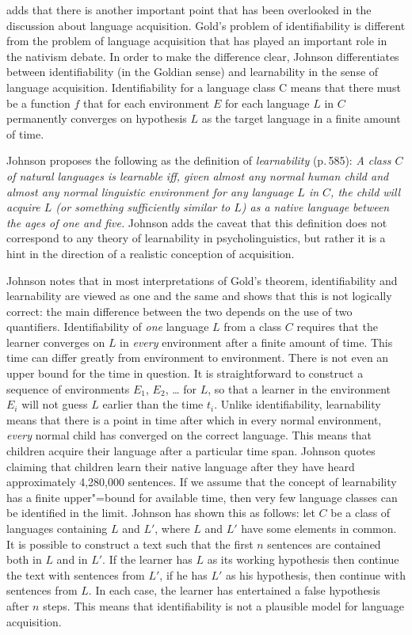 \citet{Johnson2004a} adds that there is another important point that has been overlooked in the discussion about language acquisition. Gold's problem
of identifiability is different from the problem of language acquisition that has played an important role in the nativism debate.
In order to make the difference clear, Johnson differentiates between identifiability (in the Goldian sense) and learnability in the sense of
language acquisition. Identifiability for a language class C means that there must be a function $f$ that for each environment $E$ for each
language $L$ in $C$ permanently converges on hypothesis $L$ as the target language in a finite amount of time.

Johnson proposes the following as the definition of \emph{learnability} (p.\,585):
\emph{A class $C$ of natural languages is learnable iff, given almost any normal human child and almost any
normal linguistic environment for any language $L$ in $C$, the child will acquire $L$ (or something sufficiently similar to $L$) as a native language
between the ages of one and five.} Johnson adds the caveat that this definition does not correspond to
any theory of learnability in psycholinguistics, but rather it is a hint in the direction of a
realistic conception of acquisition.

\largerpage
Johnson notes that in most interpretations of Gold's theorem, identifiability and learnability are viewed as one and the same
and shows that this is not logically correct: the main difference between the two depends on the use of two quantifiers.
Identifiability of  \emph{one} language $L$ from a class $C$ requires that the learner converges on $L$ in \emph{every} environment
after a finite amount of time. This time can differ greatly from environment to environment.
There is not even an upper bound for the time in question.
It is straightforward to construct a sequence of environments $E_1$, $E_2$, \ldots{} for $L$, so that a learner in the environment $E_i$ will not
guess $L$ earlier than the time  $t_i$. Unlike identifiability, learnability means that there is a point in time after which in every
normal environment, \emph{every} normal child has converged on the correct language. This means that children acquire their language
after a particular time span.
 Johnson quotes \citet[]{Morgan89a} claiming that children learn their native language after they have heard approximately
 4,280,000 sentences. If we assume that the concept of learnability has a finite upper"=bound for available time, then very few language
 classes can be identified in the limit. Johnson has shown this as follows: let $C$ be a class of languages containing $L$ and $L'$, where
 $L$ and $L'$ have some elements in common. It is possible to construct a text such that the first $n$ sentences are contained both in
 $L$ and in $L'$.
If the learner has $L$ as its working hypothesis  then continue the text with sentences from $L'$, if he has $L'$ as his hypothesis,
then continue with sentences from $L$. In each case, the learner has entertained a false hypothesis after $n$ steps. This means that identifiability
is not a plausible model for language acquisition.

